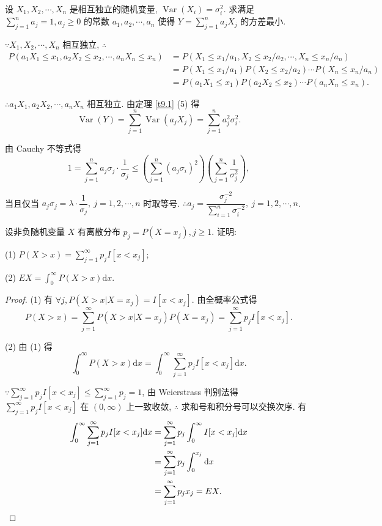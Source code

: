 \documentclass{ctexart}
\begin{document}
\begin{exercise}%
    设 $X_1,X_2,\cdots,X_n$ 是相互独立的随机变量, $\operatorname{Var}(X_i)=\sigma_i^2$. 求满足 $\sum\limits_{j=1}^na_j=1,a_j\geq0$ 的常数 $a_1,a_2,\cdots,a_n$ 使得 $Y=\sum\limits_{j=1}^na_jX_j$ 的方差最小.
\end{exercise}
\begin{solution}
    $\because X_1,X_2,\cdots,X_n$ 相互独立, $\therefore$
    \begin{align*}
        P(a_1X_1\leq x_1,a_2X_2\leq x_2,\cdots,a_nX_n\leq x_n) & =P(X_1\leq x_1/a_1,X_2\leq x_2/a_2,\cdots,X_n\leq x_n/a_n) \\
        & =P(X_1\leq x_1/a_1)P(X_2\leq x_2/a_2)\cdots P(X_n\leq x_n/a_n) \\
        & =P(a_1X_1\leq x_1)P(a_2X_2\leq x_2)\cdots P(a_nX_n\leq x_n).
    \end{align*}

    $\therefore a_1X_1,a_2X_2,\cdots,a_nX_n$ 相互独立. 由定理 \ref{t9.1} (5) 得
    \[\operatorname{Var}(Y)=\sum\limits_{j=1}^n\operatorname{Var}(a_jX_j)=\sum\limits_{j=1}^na_j^2\sigma_i^2.\]

    由 Cauchy 不等式得
    \[1=\sum\limits_{j=1}^na_j\sigma_j\cdot\dfrac{1}{\sigma_j}\leq\left(\sum\limits_{j=1}^n(a_j\sigma_i)^2\right)\left(\sum\limits_{j=1}^n\dfrac{1}{\sigma_j^2}\right),\]

    当且仅当 $a_j\sigma_j=\lambda\cdot\dfrac{1}{\sigma_j},\ j=1,2,\cdots,n$ 时取等号. $\therefore a_j=\dfrac{\sigma_j^{-2}}{\sum\limits_{i=1}^n\sigma_i^{-2}},\ j=1,2,\cdots,n$.
\end{solution}
\addtocounter{exercise}{2}
\begin{exercise}%
    设非负随机变量 $X$ 有离散分布 $p_j=P(X=x_j),j\geq 1$. 证明:
    
    (1) $P(X>x)=\sum\limits_{j=1}^\infty p_jI[x<x_j]$;

    (2) $EX=\int_0^\infty P(X>x)\mathrm{d}x$.
\end{exercise}
\begin{proof}
    (1) 有 $\forall j,P(X>x|X=x_j)=I[x<x_j]$. 由全概率公式得
    \[P(X>x)=\sum\limits_{j=1}^\infty P(X>x|X=x_j)P(X=x_j)=\sum\limits_{j=1}^\infty p_jI[x<x_j].\]

    (2) 由 (1) 得
    \[\int_0^\infty P(X>x)\mathrm{d}x=\int_0^\infty\sum\limits_{j=1}^\infty p_jI[x<x_j]\mathrm{d}x.\]

    $\because\sum\limits_{j=1}^\infty p_jI[x<x_j]\leq\sum\limits_{j=1}^\infty p_j=1$, 由 Weierstrass 判别法得 $\sum\limits_{j=1}^\infty p_jI[x<x_j]$ 在 $(0,\infty)$ 上一致收敛, $\therefore$ 求和号和积分号可以交换次序. 有
    \begin{align*}
        \int_0^\infty\sum\limits_{j=1}^\infty p_jI[x<x_j]\mathrm{d}x & =\sum\limits_{j=1}^\infty p_j\int_0^\infty I[x<x_j]\mathrm{d}x \\
        & =\sum\limits_{j=1}^\infty p_j\int_0^{x_j}\mathrm{d}x \\
        & =\sum\limits_{j=1}^\infty p_jx_j=EX.\qedhere
    \end{align*}
\end{proof}
\end{document}
